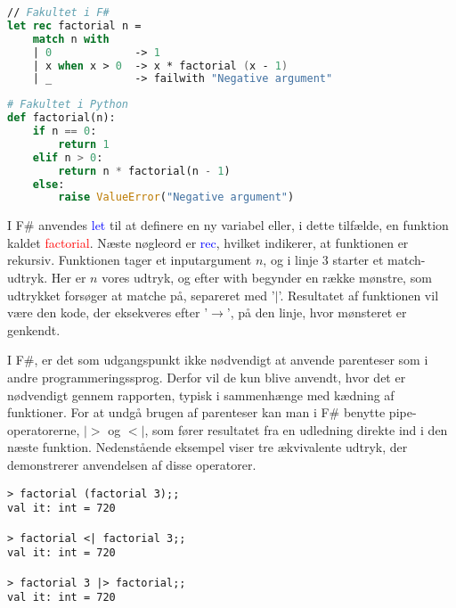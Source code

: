 \begin{lstlisting}[language={FSharp}, label={lst:fsharp_factorial}, caption={Eksempel på Fakultet i F\#}]
// Fakultet i F#
let rec factorial n =
    match n with
    | 0             -> 1 
    | x when x > 0  -> x * factorial (x - 1)
    | _             -> failwith "Negative argument"
\end{lstlisting}

\begin{lstlisting}[language={Python}, label={lst:python_factorial}, caption={Eksempel på Fakultet i Python}]
# Fakultet i Python
def factorial(n):
    if n == 0:
        return 1
    elif n > 0:
        return n * factorial(n - 1)
    else:
        raise ValueError("Negative argument")
\end{lstlisting}

I F\# anvendes \textcolor{blue}{let} til at definere en ny variabel eller, i dette tilfælde, en funktion kaldet \textcolor{red}{factorial}. Næste nøgleord er \textcolor{blue}{rec}, hvilket indikerer, at funktionen er rekursiv. Funktionen tager et inputargument \(n\), og i linje 3 starter et match-udtryk. Her er \(n\) vores udtryk, og efter \textcolor{codepurple}{with} begynder en række mønstre, som udtrykket forsøger at matche på, separeret med '\(\vert\)'. Resultatet af funktionen vil være den kode, der eksekveres efter '\(\rightarrow\)', på den linje, hvor mønsteret er genkendt.
    
I F\#, er det som udgangspunkt ikke nødvendigt at anvende parenteser som i andre programmeringssprog. Derfor vil de kun blive anvendt, hvor det er nødvendigt gennem rapporten, typisk i sammenhænge med kædning af funktioner. For at undgå brugen af parenteser kan man i F\# benytte pipe-operatorerne, $|>$ og $<|$, som fører resultatet fra en udledning direkte ind i den næste funktion. Nedenstående eksempel viser tre ækvivalente udtryk, der demonstrerer anvendelsen af disse operatorer.

\begin{lstlisting}[style=output, label={lst:pipe_operator}, caption={Eksempel på anvendelse af pipe-operatorer i F\#}]
> factorial (factorial 3);;
val it: int = 720

> factorial <| factorial 3;;
val it: int = 720

> factorial 3 |> factorial;;
val it: int = 720
\end{lstlisting}


